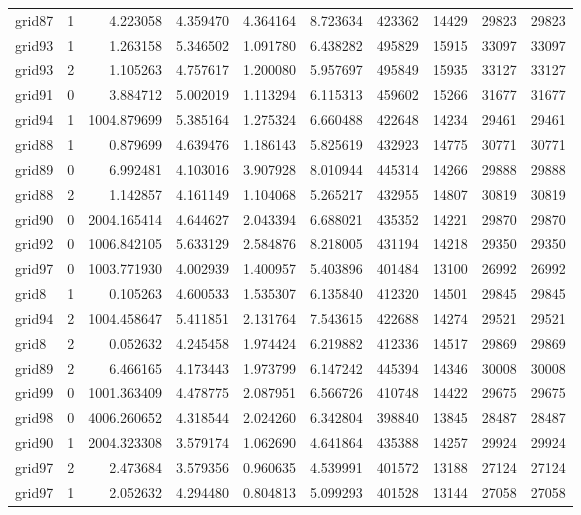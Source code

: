 \begin{longtable}{|l|r|r|r|r|r|r|r|r|r|}
grid87 & 1 & 4.223058 & 4.359470 & 4.364164 & 8.723634 & 423362 & 14429 & 29823 & 29823 \\
grid93 & 1 & 1.263158 & 5.346502 & 1.091780 & 6.438282 & 495829 & 15915 & 33097 & 33097 \\
grid93 & 2 & 1.105263 & 4.757617 & 1.200080 & 5.957697 & 495849 & 15935 & 33127 & 33127 \\
grid91 & 0 & 3.884712 & 5.002019 & 1.113294 & 6.115313 & 459602 & 15266 & 31677 & 31677 \\
grid94 & 1 & 1004.879699 & 5.385164 & 1.275324 & 6.660488 & 422648 & 14234 & 29461 & 29461 \\
grid88 & 1 & 0.879699 & 4.639476 & 1.186143 & 5.825619 & 432923 & 14775 & 30771 & 30771 \\
grid89 & 0 & 6.992481 & 4.103016 & 3.907928 & 8.010944 & 445314 & 14266 & 29888 & 29888 \\
grid88 & 2 & 1.142857 & 4.161149 & 1.104068 & 5.265217 & 432955 & 14807 & 30819 & 30819 \\
grid90 & 0 & 2004.165414 & 4.644627 & 2.043394 & 6.688021 & 435352 & 14221 & 29870 & 29870 \\
grid92 & 0 & 1006.842105 & 5.633129 & 2.584876 & 8.218005 & 431194 & 14218 & 29350 & 29350 \\
grid97 & 0 & 1003.771930 & 4.002939 & 1.400957 & 5.403896 & 401484 & 13100 & 26992 & 26992 \\
grid8 & 1 & 0.105263 & 4.600533 & 1.535307 & 6.135840 & 412320 & 14501 & 29845 & 29845 \\
grid94 & 2 & 1004.458647 & 5.411851 & 2.131764 & 7.543615 & 422688 & 14274 & 29521 & 29521 \\
grid8 & 2 & 0.052632 & 4.245458 & 1.974424 & 6.219882 & 412336 & 14517 & 29869 & 29869 \\
grid89 & 2 & 6.466165 & 4.173443 & 1.973799 & 6.147242 & 445394 & 14346 & 30008 & 30008 \\
grid99 & 0 & 1001.363409 & 4.478775 & 2.087951 & 6.566726 & 410748 & 14422 & 29675 & 29675 \\
grid98 & 0 & 4006.260652 & 4.318544 & 2.024260 & 6.342804 & 398840 & 13845 & 28487 & 28487 \\
grid90 & 1 & 2004.323308 & 3.579174 & 1.062690 & 4.641864 & 435388 & 14257 & 29924 & 29924 \\
grid97 & 2 & 2.473684 & 3.579356 & 0.960635 & 4.539991 & 401572 & 13188 & 27124 & 27124 \\
grid97 & 1 & 2.052632 & 4.294480 & 0.804813 & 5.099293 & 401528 & 13144 & 27058 & 27058 \\

\end{longtable}
